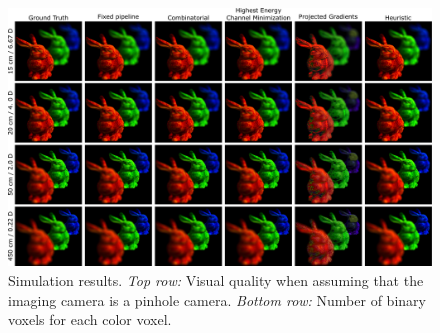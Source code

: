 \begin{figure}[h!]
\centering
\includegraphics[width=0.99\columnwidth]{images/volumetric/acd_exp2/exp_FS}
\caption[Adaptive color decomposition: focal stack]{Simulation results. \emph{Top row:} Visual quality when assuming that the imaging camera is a pinhole camera. \emph{Bottom row:} Number of binary voxels for each color voxel.}
\label{fig:volumetric:acd:exp2:focalstack}
\end{figure}

